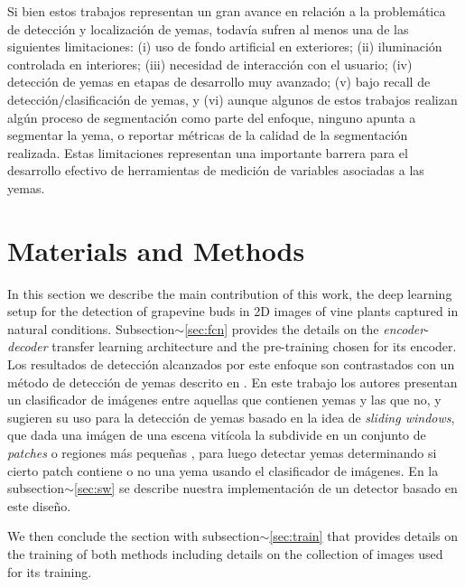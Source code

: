 \documentclass[a4paper,authoryear,review]{elsarticle}
\begin{document}
Si bien estos trabajos representan un gran avance en relación a la problemática de detección y localización de yemas, todavía sufren al menos una de las siguientes limitaciones: (i) uso de fondo artificial en exteriores; (ii) iluminación controlada en interiores; (iii) necesidad de interacción con el usuario; (iv) detección de yemas en etapas de desarrollo muy avanzado; (v) bajo recall de detección/clasificación de yemas, y (vi) aunque algunos de estos trabajos realizan algún proceso de segmentación como parte del enfoque, ninguno apunta a segmentar la yema, o reportar métricas de la calidad de la segmentación realizada. Estas limitaciones representan una importante barrera para el desarrollo efectivo de herramientas de medición de variables asociadas a las yemas. 

\section{Materials and Methods}
\label{sec:matmet}

In this section we describe the main contribution of this work, the  deep learning setup for the detection of grapevine buds in 2D images of vine plants captured in natural conditions. 
%
Subsection$\sim$\ref{sec:fcn} provides the details on the \emph{encoder}-\emph{decoder} transfer learning architecture and the pre-training chosen for its encoder. 
%
Los resultados de detección alcanzados por este enfoque son contrastados con un método de detección de yemas descrito en \citet{perez2017image}. En este trabajo los autores presentan un clasificador de imágenes entre aquellas que contienen yemas y las que no, y sugieren su uso para la detección de yemas basado en la idea de  \emph{sliding windows}, que dada una imágen de una escena vitícola la subdivide en un conjunto de \emph{patches} o regiones más pequeñas \citep{perez2017image}, para luego detectar yemas determinando si cierto patch contiene o no una yema usando el clasificador de imágenes. En la subsection$\sim$\ref{sec:sw} se describe nuestra implementación de un detector basado en este diseño.

We then conclude the section with subsection$\sim$\ref{sec:train} that provides details on the training of both methods including details on the collection of images used for its training. 
%
\end{document}
